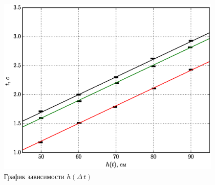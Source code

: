 \documentclass[a4paper,12pt]{report}
\begin{document}
\begin{figure}[h]
	\begin{center}
		\includegraphics*[width=1\textwidth]{img/ex4-d.eps}
		\caption{\label{fig:h-t}График зависимости $h(\Delta\,t)$}
	\end{center}
\end{figure}

\end{document}
